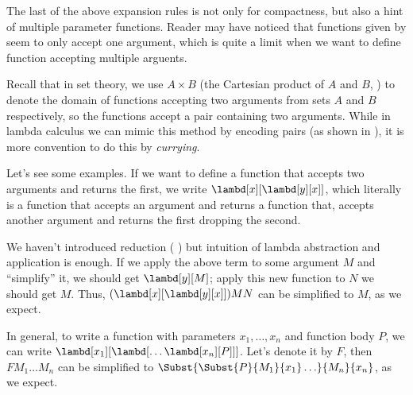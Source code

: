 \documentclass[../../../include/open-logic-section]{subfiles}
\begin{document}

The last of the above expansion rules is not only for compactness, but
also a hint of multiple parameter functions. Reader may have noticed
that functions given by  seem to only accept one argument, which
is quite a limit when we want to define function accepting multiple
arguents.

Recall that in set theory, we use $A \times B$ (the Cartesian product
of $A$ and $B$, \olref[sfr][set][pai]) to denote the domain of functions accepting two
arguments from sets $A$ and $B$ respectively, so the functions accept
a pair containing two arguments. While in lambda calculus we can mimic
this method by encoding pairs (as shown in ),
it is more convention to do this by \emph{currying}.

Let's see some examples. If we want to define a function that accepts
two arguments and returns the first, we write
$\lambd[x][\lambd[y][x]]$, which literally is a function that accepts
an argument and returns a function that, accepts another argument and
returns the first dropping the second. 

We haven't introduced reduction ( ) but intuition
of lambda abstraction and application is enough. If we apply the above
term to some argument $M$ and ``simplify'' it, we should get $\lambd[y][M]$; apply this new function to $N$
we should get $M$. Thus, $(\lambd[x][\lambd[y][x]])MN$ can be
simplified to $M$, as we expect.

In general, to write a function with parameters $x_1, \ldots, x_n$
and function body $P$, we can write
$\lambd[x_1][\lambd[\ldots\lambd[x_n][P]]]$. Let's denote it by $F$,
then $FM_1\ldots M_n$ can be simplified to
$\Subst{\Subst{P}{M_1}{x_1}\ldots}{M_n}{x_n}$, as we expect.
\end{document}
